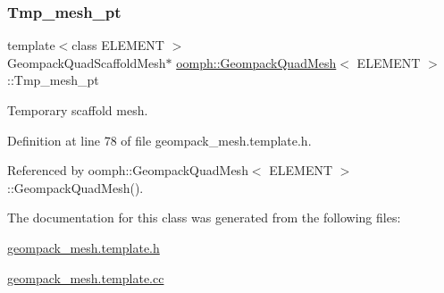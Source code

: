 \subsubsection{\texorpdfstring{Tmp\+\_\+mesh\+\_\+pt}{Tmp\_mesh\_pt}}
{\footnotesize\ttfamily template$<$class E\+L\+E\+M\+E\+NT $>$ \\
Geompack\+Quad\+Scaffold\+Mesh$\ast$ \hyperlink{classoomph_1_1GeompackQuadMesh}{oomph\+::\+Geompack\+Quad\+Mesh}$<$ E\+L\+E\+M\+E\+NT $>$\+::Tmp\+\_\+mesh\+\_\+pt\hspace{0.3cm}{\ttfamily [private]}}



Temporary scaffold mesh. 



Definition at line 78 of file geompack\+\_\+mesh.\+template.\+h.



Referenced by oomph\+::\+Geompack\+Quad\+Mesh$<$ E\+L\+E\+M\+E\+N\+T $>$\+::\+Geompack\+Quad\+Mesh().



The documentation for this class was generated from the following files\+:\begin{DoxyCompactItemize}
\item 
\hyperlink{geompack__mesh_8template_8h}{geompack\+\_\+mesh.\+template.\+h}\item 
\hyperlink{geompack__mesh_8template_8cc}{geompack\+\_\+mesh.\+template.\+cc}\end{DoxyCompactItemize}
